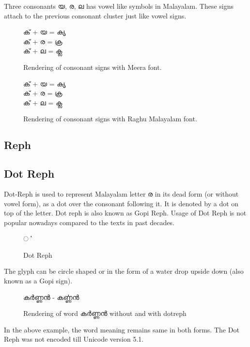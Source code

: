 Three consonants {\malayalam യ, ര, ല} has vowel like symbols in Malayalam.
These signs attach to the previous consonant cluster just like vowel signs.

\begin{figure}[h!]
  \centering
  {\meera\textexample ക് + യ = ക്യ \\ ക് + ര = ക്ര \\ ക് + ല = ക്ല }\\
  \caption{Rendering of consonant signs with Meera font.}
\end{figure}

\begin{figure}[h!]
  \centering
  {\raghumalayalam\textexample ക് + യ = ക്യ \\ ക് + ര = ക്ര \\ ക് + ല = ക്ല }\\
  \caption{Rendering of consonant signs with Raghu Malayalam font.}
\end{figure}

\subsection {Reph}
\subsection {Dot Reph}

Dot-Reph is used to represent Malayalam letter  {\meera ര} in its dead form
(or without vowel form), as a dot over the consonant following it.  It is
denoted by a dot on top of the letter. Dot reph is also known as Gopi Reph.
Usage of Dot Reph is not popular nowadays compared to the texts in past
decades.

\begin{figure}[h!]
  \centering
  {\meera\textexample ൎ }\\
  \caption{Dot Reph}
\end{figure}

The glyph can be circle shaped or in the form of a water drop upside down (also
known as a Gopi sign).

\begin{figure}[h!]
  \centering
  {\meera\textexample കര്‍ണ്ണന്‍  - കൎണ്ണന്‍ }\\
  \caption{Rendering of word കര്‍ണ്ണന്‍ without and with dotreph}
\end{figure}

In the above example, the word meaning remains same in both forms. The Dot Reph
was not encoded till Unicode version 5.1.

